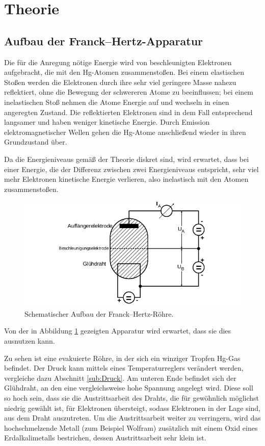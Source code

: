 \section{Theorie}
\label{sec:Theorie}

\subsection{Aufbau der Franck--Hertz-Apparatur}

Die für die Anregung nötige Energie wird von beschleunigten Elektronen aufgebracht, die mit den Hg-Atomen zusammenstoßen. 
Bei einem elastischen Stoßen werden die Elektronen durch ihre sehr viel geringere Masse nahezu reflektiert, ohne die Bewegung der 
schwereren Atome zu beeinflussen; bei einem inelastischen Stoß nehmen die Atome Energie auf und wechseln in einen angeregten Zustand.
Die reflektierten Elektronen sind in dem Fall entsprechend langsamer und haben weniger kinetische Energie. Durch Emission elektromagnetischer Wellen 
gehen die Hg-Atome anschließend wieder in ihren Grundzustand über. \cite{Versuchsanleitung}

Da die Energieniveaus gemäß der Theorie diskret sind, wird erwartet, dass bei einer Energie, die der Differenz zwischen 
zwei Energieniveaus entspricht, sehr viel mehr Elektronen kinetische Energie verlieren, also inelastisch mit den Atomen zusammenstoßen. 

\begin{figure}
    \centering
    \includegraphics[width=\textwidth]{plots/schemaAufbau.png}
    \caption{Schematischer Aufbau der Franck--Hertz-Röhre\cite{Versuchsanleitung}.}
    \label{fig:schemaAufbau}
\end{figure}

Von der in Abbildung \ref{fig:schemaAufbau} gezeigten Apparatur wird erwartet, dass sie dies ausnutzen kann. 

Zu sehen ist eine evakuierte Röhre, in der sich ein winziger Tropfen Hg-Gas befindet. 
Der Druck kann mittels eines Temperaturreglers verändert werden, vergleiche dazu Abschnitt \ref{sub:Druck}. 
Am unteren Ende befindet sich der Glühdraht, an den eine vergleichsweise hohe Spannung angelegt wird. 
Diese soll so hoch sein, dass sie die Austrittsarbeit des Drahts, die für gewöhnlich möglichst niedrig gewählt ist, 
für Elektronen übersteigt, sodass Elektronen in der Lage sind, aus dem Draht auszutreten. 
Um die Austrittsarbeit weiter zu verringern, wird das hochschmelzende Metall (zum Beispiel Wolfram) zusätzlich mit 
einem Oxid eines Erdalkalimetalls bestrichen, dessen Austrittsarbeit sehr klein ist\cite{Versuchsanleitung}. 


